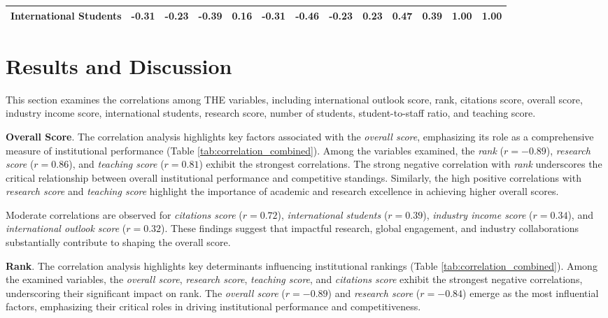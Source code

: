 \documentclass[conference]{IEEEtran}
\begin{document}
\begin{table*}[h!]
\begin{tabular}{|l|r|r|r|r|r|r|r|r|r|r|r|r|}
	International Students & \cellcolor{gray!15}-0.31 & \cellcolor{gray!11}-0.23 & \cellcolor{gray!13}-0.39 & \cellcolor{gray!8}0.16 & \cellcolor{gray!15}-0.31 & \cellcolor{gray!23}-0.46 & \cellcolor{gray!11}-0.23 & \cellcolor{gray!11}0.23 & \cellcolor{gray!23}0.47 & \cellcolor{gray!19}0.39 & \cellcolor{gray!50}1.00 & 1.00 \\
	
	
		\hline
	\end{tabular}
\end{table*}




\section{Results and Discussion}
This section examines the correlations among THE variables, including international outlook score, rank, citations score, overall score, industry income score, international students, research score, number of students, student-to-staff ratio, and teaching score. 

\textbf{Overall Score}. The correlation analysis highlights key factors associated with the \textit{overall score}, emphasizing its role as a comprehensive measure of institutional performance (Table \ref{tab:correlation_combined}). Among the variables examined, the \textit{rank} ($r = -0.89$), \textit{research score} ($r = 0.86$), and \textit{teaching score} ($r = 0.81$) exhibit the strongest correlations. The strong negative correlation with \textit{rank} underscores the critical relationship between overall institutional performance and competitive standings. Similarly, the high positive correlations with \textit{research score} and \textit{teaching score} highlight the importance of academic and research excellence in achieving higher overall scores.

Moderate correlations are observed for \textit{citations score} ($r = 0.72$), \textit{international students} ($r = 0.39$), \textit{industry income score} ($r = 0.34$), and \textit{international outlook score} ($r = 0.32$). These findings suggest that impactful research, global engagement, and industry collaborations substantially contribute to shaping the overall score.


\textbf{Rank}. The correlation analysis highlights key determinants influencing institutional rankings (Table \ref{tab:correlation_combined}). Among the examined variables, the \textit{overall score}, \textit{research score}, \textit{teaching score}, and \textit{citations score} exhibit the strongest negative correlations, underscoring their significant impact on rank. The \textit{overall score} ($r = -0.89$) and \textit{research score} ($r = -0.84$) emerge as the most influential factors, emphasizing their critical roles in driving institutional performance and competitiveness.
\end{document}
